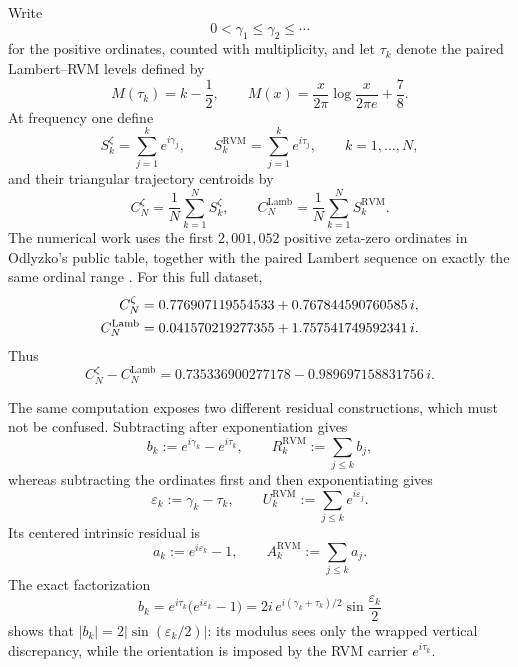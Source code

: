 \documentclass[11pt]{amsart}
\numberwithin{equation}{section}
\theoremstyle{definition}
\theoremstyle{remark}
\begin{document}
Write
\[
0<\gamma_1\leq\gamma_2\leq\cdots
\]
for the positive ordinates, counted with multiplicity, and let $\tau_k$ denote the paired Lambert--RVM levels defined by
\begin{equation}\label{eq:intro_rvm_levels}
M(\tau_k)=k-\frac12,
\qquad
M(x)=\frac{x}{2\pi}\log\frac{x}{2\pi e}+\frac78.
\end{equation}
At frequency one define
\begin{equation}\label{eq:intro_zeta_walk}
S_k^{\zeta}=\sum_{j=1}^{k}e^{i\gamma_j},
\qquad
S_k^{\mathrm{RVM}}=\sum_{j=1}^{k}e^{i\tau_j},
\qquad k=1,\ldots,N,
\end{equation}
and their triangular trajectory centroids by
\begin{equation}\label{eq:intro_centroid_definition}
C_N^{\zeta}=\frac1N\sum_{k=1}^{N}S_k^{\zeta},
\qquad
C_N^{\mathrm{Lamb}}=\frac1N\sum_{k=1}^{N}S_k^{\mathrm{RVM}}.
\end{equation}
The numerical work uses the first $2{,}001{,}052$ positive zeta-zero ordinates in Odlyzko's public table, together with the paired Lambert sequence on exactly the same ordinal range \cite{OdlyzkoTables}. For this full dataset,
\begin{align}
C_N^{\zeta}
&=0.776907119554533+0.767844590760585\,i,\notag\\
C_N^{\mathrm{Lamb}}
&=0.041570219277355+1.757541749592341\,i.\label{eq:intro_two_centroids}
\end{align}
Thus
\begin{equation}\label{eq:intro_centroid_difference}
C_N^{\zeta}-C_N^{\mathrm{Lamb}}
=0.735336900277178-0.989697158831756\,i.
\end{equation}

The same computation exposes two different residual constructions, which must not be confused. Subtracting after exponentiation gives
\begin{equation}\label{eq:intro_paired_residual}
b_k:=e^{i\gamma_k}-e^{i\tau_k},
\qquad
R_k^{\mathrm{RVM}}:=\sum_{j\le k}b_j,
\end{equation}
whereas subtracting the ordinates first and then exponentiating gives
\begin{equation}\label{eq:intro_intrinsic_phase}
\varepsilon_k:=\gamma_k-\tau_k,
\qquad
U_k^{\mathrm{RVM}}:=\sum_{j\le k}e^{i\varepsilon_j}.
\end{equation}
Its centered intrinsic residual is
\begin{equation}\label{eq:intro_intrinsic_centered}
a_k:=e^{i\varepsilon_k}-1,
\qquad
A_k^{\mathrm{RVM}}:=\sum_{j\le k}a_j.
\end{equation}
The exact factorization
\begin{equation}\label{eq:intro_residual_factorization}
\boxed{
b_k=e^{i\tau_k}\bigl(e^{i\varepsilon_k}-1\bigr)
=2i\,e^{i(\gamma_k+\tau_k)/2}\sin\frac{\varepsilon_k}{2}}
\end{equation}
shows that $|b_k|=2|\sin(\varepsilon_k/2)|$: its modulus sees only the wrapped vertical discrepancy, while the orientation is imposed by the RVM carrier $e^{i\tau_k}$.
\end{document}
